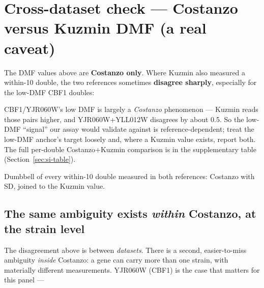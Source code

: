 \section{Cross-dataset check --- Costanzo versus Kuzmin DMF (a real caveat)}

The DMF values above are \textbf{Costanzo only}. Where Kuzmin also measured a within-10
double, the two references sometimes \textbf{disagree sharply}, especially for the low-DMF
CBF1 doubles:


CBF1/YJR060W's low DMF is largely a \emph{Costanzo} phenomenon --- Kuzmin reads those pairs
higher, and YJR060W+YLL012W disagrees by about 0.5. So the low-DMF ``signal'' our assay would
validate against is reference-dependent; treat the low-DMF anchor's target loosely and, where
a Kuzmin value exists, report both. The full per-double Costanzo+Kuzmin comparison is in the
supplementary table (Section~\ref{sec:si-table}).

%
  {Dumbbell of every within-10 double measured in both references: Costanzo with SD, joined
   to the Kuzmin value.}

\subsection{The same ambiguity exists \emph{within} Costanzo, at the strain level}

The disagreement above is between \emph{datasets}. There is a second, easier-to-miss
ambiguity \emph{inside} Costanzo: a gene can carry more than one strain, with materially
different measurements. YJR060W (CBF1) is the case that matters for this panel ---

